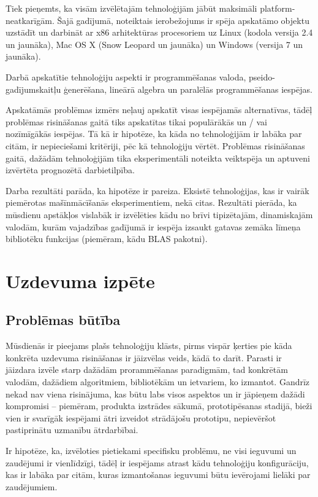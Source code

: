 \documentclass{ludis}
\begin{document}
Tiek pieņemts, ka visām izvēlētajām tehnoloģijām jābūt maksimāli platform-neatkarīgām. Šajā gadījumā, noteiktais ierobežojums ir spēja apskatāmo objektu uzstādīt un darbināt ar x86 arhitektūras procesoriem uz Linux (kodola versija 2.4 un jaunāka), Mac OS X (Snow Leopard un jaunāka) un Windows (versija 7 un jaunāka).

Darbā apskatītie tehnoloģiju aspekti ir programmēšanas valoda, pseido-gadījumskaitļu ģenerēšana, lineārā algebra un paralēlās programmēšanas iespējas.

Apskatāmās problēmas izmērs neļauj apskatīt visas iespējamās alternatīvas, tādēļ problēmas risināšanas gaitā tiks apskatītas tikai populārākās un / vai nozīmīgākās iespējas. Tā kā ir hipotēze, ka kāda no tehnoloģijām ir labāka par citām, ir nepieciešami kritēriji, pēc kā tehnoloģiju vērtēt. Problēmas risināšanas gaitā, dažādām tehnoloģijām tika eksperimentāli noteikta veiktspēja un aptuveni izvērtēta prognozētā darbietilpība.

Darba rezultāti parāda, ka hipotēze ir pareiza. Eksistē tehnoloģijas, kas ir vairāk piemērotas mašīnmācīšanās eksperimentiem, nekā citas. Rezultāti pierāda, ka mūsdienu apstākļos vislabāk ir izvēlēties kādu no brīvi tipizētajām, dinamiskajām valodām, kurām vajadzības gadījumā ir iespēja izsaukt gatavas zemāka līmeņa bibliotēku funkcijas (piemēram, kādu BLAS pakotni).

\chapter{Uzdevuma izpēte}
\section{Problēmas būtība}
Mūsdienās ir pieejams plašs tehnoloģiju klāsts, pirms vispār ķerties pie kāda konkrēta uzdevuma risināšanas ir jāizvēlas veids, kādā to darīt. Parasti ir jāizdara izvēle starp dažādām prorammēšanas paradigmām, tad konkrētām valodām, dažādiem algoritmiem, bibliotēkām un ietvariem, ko izmantot. Gandrīz nekad nav viena risinājuma, kas būtu labs visos aspektos un ir jāpieņem dažādi kompromisi -- piemēram, produkta izstrādes sākumā, prototipēsanas stadijā, bieži vien ir svarīgāk iespējami ātri izveidot strādājošu prototipu, nepievēršot pastiprinātu uzmanību ātrdarbībai.

Ir hipotēze, ka, izvēloties pietiekami specifisku problēmu, ne visi ieguvumi un zaudējumi ir vienlīdzīgi, tādēļ ir iespējams atrast kādu tehnoloģiju konfigurāciju, kas ir labāka par citām, kuras izmantošanas ieguvumi būtu ievērojami lielāki par zaudējumiem.
\end{document}
